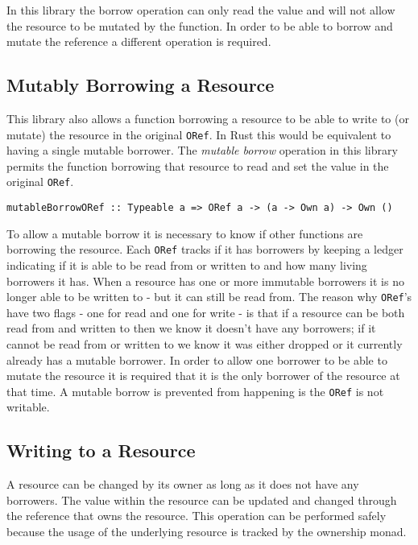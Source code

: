 \documentclass[onehalf,11pt]{beavtex}
\begin{document}
In this library the borrow operation can only read the value and will not allow
the resource to be mutated by the function.  In order to be able to borrow and
mutate the reference a different operation is required.

\subsection{Mutably Borrowing a Resource}

This library also allows a function borrowing a resource to be able to
write to (or mutate) the resource in the original \texttt{ORef}.  In Rust this would be
equivalent to having a single mutable borrower.  The \textit{mutable borrow}
operation in this library permits the function borrowing that resource to read
and set the value in the original \texttt{ORef}.

\begin{verbatim}
mutableBorrowORef :: Typeable a => ORef a -> (a -> Own a) -> Own ()
\end{verbatim}

To allow a mutable borrow it is necessary to know if other functions are
borrowing the resource.  Each \texttt{ORef} tracks if it has borrowers by keeping a
ledger indicating if it is able to be read from or written to and how many
living borrowers it has.  When a resource has one or more immutable borrowers it
is no longer able to be written to - but it can still be read from.
The reason why \texttt{ORef}'s have two flags - one for read and one for write - is that
if a resource can be both read from and written to then we know it doesn't have
any borrowers; if it cannot be read from or written to we know it was either
dropped or it currently already has a mutable borrower.
In order to allow one borrower to be able to mutate the resource it is required
that it is the only borrower of the resource at that time. %
A mutable borrow is prevented from happening is the \texttt{ORef} is not writable.


\subsection{Writing to a Resource}

A resource can be changed by its owner as long as it does not have any borrowers.
The value within the resource can be updated and changed through the reference
that owns the resource. This operation can be performed safely because the usage
of the underlying resource is tracked by the ownership monad.
\end{document}
